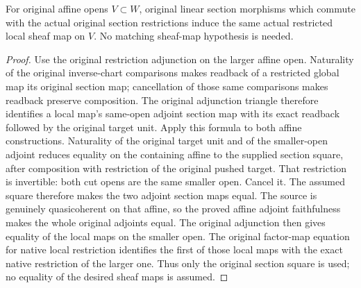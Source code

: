 \begin{lemma}
\label{lem:di-affine-local-map-restriction}
\leanok
{}
For original affine opens $V\subset W$, original linear section morphisms
which commute with the actual original section restrictions induce the
same actual restricted local sheaf map on $V$. No matching sheaf-map
hypothesis is needed.
\end{lemma}
\begin{proof}
Use the original restriction adjunction on the larger affine open.
Naturality of the original inverse-chart comparisons makes readback of a
restricted global map its original section map; cancellation of those same
comparisons makes readback preserve composition. The original adjunction
triangle therefore identifies a local map's same-open adjoint section map
with its exact readback followed by the original target unit. Apply this
formula to both affine constructions. Naturality of the original target
unit and of the smaller-open adjoint reduces equality on the containing
affine to the supplied section square, after composition with restriction
of the original pushed target. That restriction is invertible: both cut
opens are the same smaller open. Cancel it. The assumed square therefore
makes the two adjoint section maps equal. The source is genuinely
quasicoherent on that affine, so the proved affine adjoint faithfulness
makes the whole original adjoints equal. The original adjunction then
gives equality of the local maps on the smaller open. The original
factor-map equation for native local restriction identifies the first of
those local maps with the exact native restriction of the larger one.
Thus only the original section square is used; no equality of the desired
sheaf maps is assumed.
\end{proof}
